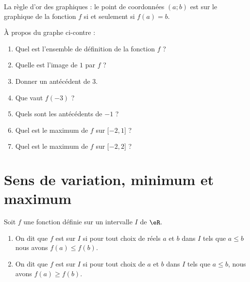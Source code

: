 \begin{Aretenir}
    La règle d'or des graphiques : le point de coordonnées \( (a;b)\) est sur le graphique de la fonction \( f\) si et seulement si \( f(a)=b\).
\end{Aretenir}

\clearpage

\begin{multicols}{2}

À propos du graphe ci-contre :
\begin{enumerate}
    \item
        Quel est l'ensemble de définition de la fonction \( f\) ?
    \item
        Quelle est l'image de \( 1\) par \( f\) ?
    \item
        Donner un antécédent de \( 3\).
    \item
        Que vaut \( f(-3)\) ?
    \item
        Quels sont les antécédents de \( -1\) ?
    \item 
        Quel est le maximum de \( f\) sur \( \mathopen[ -2 , 1 \mathclose]\) ?
    \item
        Quel est le maximum de \( f\) sur \( \mathopen[ -2 , 2 \mathclose]\) ?
\end{enumerate}
    
    \columnbreak

\begin{center}
   
\end{center}

\end{multicols}

\section{Sens de variation, minimum et maximum}

\begin{definition}
      Soit $f$ une fonction définie sur un intervalle \( I\) de \( \eR\).
      \begin{enumerate}
          \item 
              On dit que $f$ est  sur $I$ si pour tout choix de réels $a$ et $b$ dans $I$ tels que $a\leq b$ nous avons $f(a)\leq f(b)$.
    \item 
        On dit que $f$ est  sur $I$ si pour tout choix de $a$ et $b$ dans $I$ tels que $a\leq b$, nous avons $f(a)\geq f(b)$. 
      \end{enumerate}
\end{definition}

